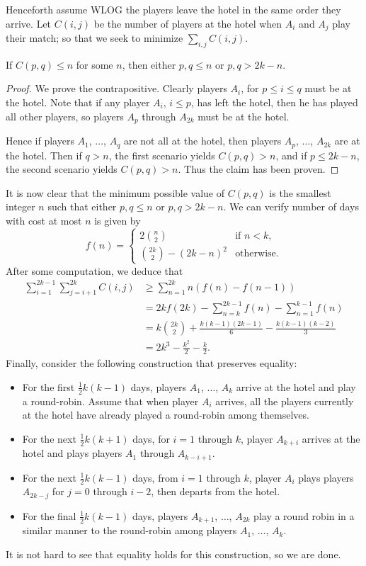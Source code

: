 Henceforth assume WLOG the players leave the hotel in the same order they arrive. Let $C(i,j)$ be the number of players at the hotel when $A_i$ and $A_j$ play their match; so that we seek to minimize $\sum_{i,j}C(i,j)$.
\begin{claim}
    If $C(p,q)\le n$ for some $n$, then either $p,q\le n$ or $p,q>2k-n$.
\end{claim}
\begin{proof}
    We prove the contrapositive. Clearly players $A_i$, for $p\le i\le q$ must be at the hotel. Note that if any player $A_i$, $i\le p$, has left the hotel, then he has played all other players, so players $A_p$ through $A_{2k}$ must be at the hotel.

    Hence if players $A_1$, $\ldots$, $A_q$ are not all at the hotel, then players $A_p$, $\ldots$, $A_{2k}$ are at the hotel. Then if $q>n$, the first scenario yields $C(p,q)>n$, and if $p\le 2k-n$, the second scenario yields $C(p,q)>n$. Thus the claim has been proven.
\end{proof}

It is now clear that the minimum possible value of $C(p,q)$ is the smallest integer $n$ such that either $p,q\le n$ or $p,q>2k-n$. We can verify number of days with cost at most $n$ is given by \[f(n)=\begin{cases}2\binom n2&\text{if }n<k,\\ \binom{2k}2-(2k-n)^2&\text{otherwise.}\end{cases}\]
After some computation, we deduce that
\begin{align*}
    \sum_{i=1}^{2k-1}\sum_{j=i+1}^{2k}C(i,j)&\ge\sum_{n=1}^{2k}n(f(n)-f(n-1))\\
    &=2kf(2k)-\sum_{n=k}^{2k-1}f(n)-\sum_{n=1}^{k-1}f(n)\\
    &=k\binom{2k}2+\frac{k(k-1)(2k-1)}6-\frac{k(k-1)(k-2)}3\\
    &=2k^3-\frac{k^2}2-\frac k2.
\end{align*}
Finally, consider the following construction that preserves equality:
\begin{itemize}
    \item For the first $\frac12k(k-1)$ days, players $A_1$, $\ldots$, $A_k$ arrive at the hotel and play a round-robin. Assume that when player $A_i$ arrives, all the players currently at the hotel have already played a round-robin among themselves.
    \item For the next $\frac12k(k+1)$ days, for $i=1$ through $k$, player $A_{k+i}$ arrives at the hotel and plays players $A_1$ through $A_{k-i+1}$.
    \item For the next $\frac12k(k-1)$ days, from $i=1$ through $k$, player $A_i$ plays players $A_{2k-j}$ for $j=0$ through $i-2$, then departs from the hotel.
    \item For the final $\frac12k(k-1)$ days, players $A_{k+1}$, $\ldots$, $A_{2k}$ play a round robin in a similar manner to the round-robin among players $A_1$, $\ldots$, $A_k$.
\end{itemize}
It is not hard to see that equality holds for this construction, so we are done.
